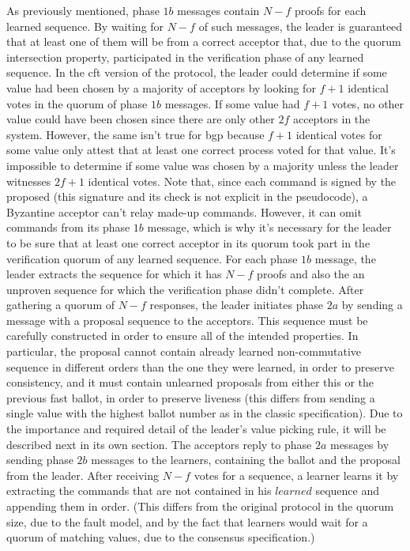 As previously mentioned, phase $1b$ messages contain $N-f$ proofs for each learned sequence. By waiting for $N-f$ of such messages, the leader is guaranteed that at least one of them will be from a correct acceptor that, due to the quorum intersection property, participated in the verification phase of any learned sequence. {\color{red}In the \acrshort{cft} version of the protocol, the leader could determine if some value had been chosen by a majority of acceptors by looking for $f+1$ identical votes in the quorum of phase $1b$ messages. If some value had $f+1$ votes, no other value could have been chosen since there are only other $2f$ acceptors in the system. However, the same isn't true for \acrshort{bgp} because $f+1$ identical votes for some value only attest that at least one correct process voted for that value. It's impossible to determine if some value was chosen by a majority unless the leader witnesses $2f+1$ identical votes.} Note that, since each command is signed by the proposed (this signature and its check is not explicit in the pseudocode), a Byzantine acceptor can't relay made-up commands. However, it can omit commands from its phase $1b$ message, which is why it's necessary for the leader to be sure that at least one correct acceptor in its quorum took part in the verification quorum of any learned sequence. For each phase $1b$ message, the leader extracts the sequence for which it has $N-f$ proofs and also the an unproven sequence for which the verification phase didn't complete. After gathering a quorum of $N-f$ responses, the leader initiates phase $2a$ by sending a message with a proposal sequence to the acceptors. This sequence must be carefully constructed in order to ensure all of the intended properties. In particular, the proposal cannot contain already learned non-commutative sequence in different orders than the one they were learned, in order to preserve consistency, and it must contain unlearned proposals from either this or the previous fast ballot, in order to preserve liveness (this differs from sending a single value with the highest ballot number as in the classic specification). Due to the importance and required detail of the leader's value picking rule, it will be described next in its own section. The acceptors reply to phase $2a$ messages by sending phase $2b$ messages to the learners, containing the ballot and the proposal from the leader. After receiving $N-f$ votes for a sequence, a learner learns it by extracting the commands that are not contained in his $learned$ sequence and appending them in order. (This differs from the original protocol in the quorum size, due to the fault model, and by the fact that learners would wait for a quorum of matching values, due to the consensus specification.)\par

